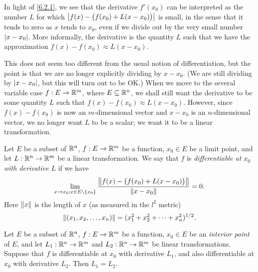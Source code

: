 \begin{note}
  In light of \cref{6.2.1}, we see that the derivative \(f'(x_0)\) can be interpreted as the number \(L\) for which \(\abs{f(x) - \big(f(x_0) + L(x - x_0)\big)}\) is small, in the sense that it tends to zero as \(x\) tends to \(x_0\), even if we divide out by the very small number \(\abs{x - x_0}\).
  More informally, the derivative is the quantity \(L\) such that we have the approximation \(f(x) - f(x_0) \approx L(x - x_0)\).

  This does not seem too different from the usual notion of differentiation, but the point is that we are no longer explicitly dividing by \(x - x_0\).
  (We are still dividing by \(\abs{x - x_0}\), but this will turn out to be OK.)
  When we move to the several variable case \(f : E \to \R^m\), where \(E \subseteq \R^n\), we shall still want the derivative to be some quantity \(L\) such that \(f(x) - f(x_0) \approx L(x - x_0)\).
  However, since \(f(x) - f(x_0)\) is now an \(m\)-dimensional vector and \(x - x_0\) is an \(n\)-dimensional vector, we no longer want \(L\) to be a scalar;
  we want it to be a linear transformation.
\end{note}

\begin{defn}[Differentiability]\label{6.2.2}
  Let \(E\) be a subset of \(\R^n\), \(f : E \to \R^m\) be a function, \(x_0 \in E\) be a limit point, and let \(L : \R^n \to \R^m\) be a linear transformation.
  We say that \(f\) is \emph{differentiable at \(x_0\) with derivative \(L\)} if we have
  \[
    \lim_{x \to x_0 ; x \in E \setminus \{x_0\}} \dfrac{\norm*{f(x) - \big(f(x_0) + L(x - x_0)\big)}}{\norm*{x - x_0}} = 0.
  \]
  Here \(\norm*{x}\) is the length of \(x\) (as measured in the \(l^2\) metric)
  \[
    \norm*{(x_1, x_2, \dots, x_n)} = (x_1^2 + x_2^2 + \dots + x_n^2)^{1 / 2}.
  \]
\end{defn}

\setcounter{thm}{3}
\begin{lem}\label{6.2.4}
  Let \(E\) be a subset of \(\R^n\), \(f : E \to \R^m\) be a function, \(x_0 \in E\) be an \emph{interior point} of \(E\), and let \(L_1 : \R^n \to \R^m\) and \(L_2 : \R^n \to \R^m\) be linear transformations.
  Suppose that \(f\) is differentiable at \(x_0\) with derivative \(L_1\), and also differentiable at \(x_0\) with derivative \(L_2\).
  Then \(L_1 = L_2\).
\end{lem}

